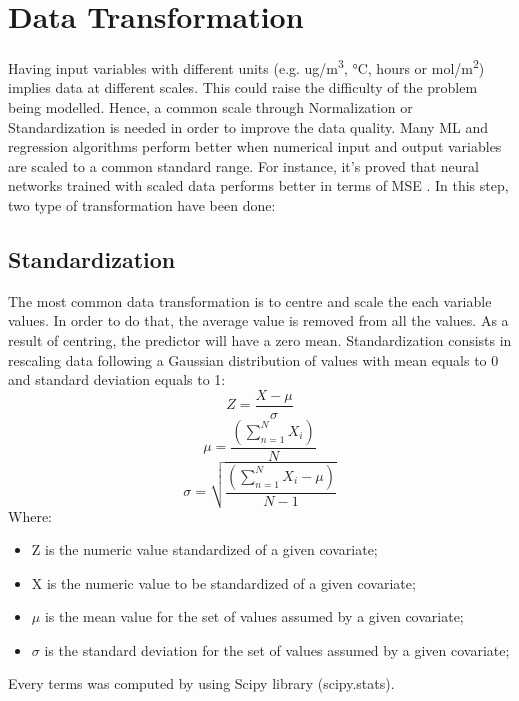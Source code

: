 \section{Data Transformation}
Having input variables with different units (e.g. ug/m\textsuperscript{3}, °C, hours or mol/m\textsuperscript{2}) implies data at different scales. This could raise the difficulty of the problem being modelled. \newline
Hence, a common scale through Normalization or Standardization is needed in order to improve the data quality.\newline
Many ML and regression algorithms perform better when numerical input and output variables are scaled to a common standard range. \newline
For instance, it's proved that neural networks trained with scaled data performs better in terms of MSE \cite{shanker1996effect}.
In this step, two type of transformation have been done:
\subsection{Standardization}
The most common data transformation is to centre and scale the each variable values. In order to do that, the average value is removed from all the values. As a result of centring, the predictor will have a zero mean.\cite{kuhn2013applied}
Standardization consists in rescaling data following a Gaussian distribution of values with mean equals to 0 and standard deviation equals to 1:
\begin{equation}
  Z = \frac{X-\mu}{\sigma}
\end{equation}
\begin{equation}
\mu = \frac{(\sum_{n=1}^{N} X_i)}{N}
\end{equation}
\begin{equation}
\sigma = \sqrt{\frac{(\sum_{n=1}^{N} X_i-\mu)}{N-1}}
\end{equation}
Where:
\begin{itemize}
\item Z is the numeric value standardized of a given covariate;
\item X is the numeric value to be standardized of a given covariate;
\item $\mu$ is the mean value for the set of values assumed by a given covariate;
\item $\sigma$ is the standard deviation for the set of values assumed by a given covariate;
\end{itemize}
Every terms was computed by using Scipy library (scipy.stats). 
\bigbreak
